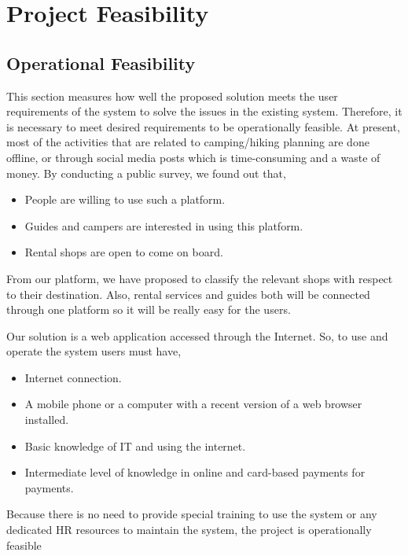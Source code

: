 \section{Project Feasibility }
\subsection{Operational Feasibility}
This section measures how well the proposed solution meets the user requirements
of the system to solve the issues in the existing system. Therefore, it is necessary to
meet desired requirements to be operationally feasible. 
At present, most of the activities that are related to camping/hiking planning are done offline, or through social media posts which is time-consuming and a waste of money. 
By conducting a public survey, we found out that,
\begin{itemize}
\item People are willing to use such a platform.
\item Guides and campers are interested in using this platform.
\item Rental shops are open to come on board.
\end{itemize}
From our platform, we have proposed to classify the relevant shops with respect to their destination. Also, rental services and guides both will be connected through one platform so it will be really easy for the users.

Our solution is a web application accessed through the Internet. So, to use and operate the system users must have,
\begin{itemize}
\item Internet connection.
\item A mobile phone or a computer with a recent version of a web browser installed.
\item Basic knowledge of IT and using the internet.
\item Intermediate level of knowledge in online and card-based payments for payments.
\end{itemize}

Because there is no need to provide special training to use the system or any
dedicated HR resources to maintain the system, the project is operationally feasible



